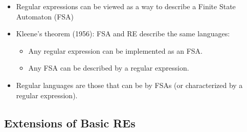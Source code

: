 \begin{frame}[fragile]
\begin{itemize}
\item Regular expressions can be viewed as a way to describe a Finite
  State Automaton (FSA)
  
\item Kleene's theorem (1956): FSA and RE describe the same languages:
  \begin{itemize}
    \item Any regular expression can be implemented as an FSA.
    \item Any FSA can be described by a regular expression.
  \end{itemize}
  
\item Regular languages are those that can be  by FSAs (or
  characterized by a regular expression).
  \end{itemize}

\end{frame}

\subsection{Extensions of Basic REs}

